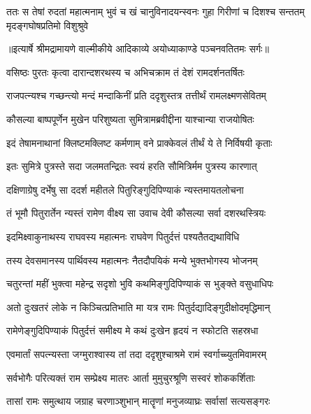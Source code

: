 \fourlineindentedshloka
{ततः स तेषां रुदतां महात्मनाम्}
{भुवं च खं चानुविनादयन्स्वनः}
{गुहा गिरीणां च दिशश्च सन्ततम्}
{मृदङ्गघोषप्रतिमो विशुश्रुवे} %


{॥इत्यार्षे श्रीमद्रामायणे वाल्मीकीये आदिकाव्ये अयोध्याकाण्डे पञ्चनवतितमः सर्गः॥}


\twolineshloka
{वसिष्ठः पुरतः कृत्वा दारान्दशरथस्य च}
{अभिचक्राम तं देशं रामदर्शनतर्षितः} %

\twolineshloka
{राजपत्न्यश्च गच्छन्त्यो मन्दं मन्दाकिनीं प्रति}
{ददृशुस्तत्र तत्तीर्थं रामलक्ष्मणसेवितम्} %

\twolineshloka
{कौसल्या बाष्पपूर्णेन मुखेन परिशुष्यता}
{सुमित्रामब्रवीद्दीना याश्चान्या राजयोषितः} %

\twolineshloka
{इदं तेषामनाथानां क्लिष्टमक्लिष्ट कर्मणाम्}
{वने प्राक्केवलं तीर्थं ये ते निर्विषयी कृताः} %

\twolineshloka
{इतः सुमित्रे पुत्रस्ते सदा जलमतन्द्रितः}
{स्वयं हरति सौमित्रिर्मम पुत्रस्य कारणात्} %

\twolineshloka
{दक्षिणाग्रेषु दर्भेषु सा ददर्श महीतले}
{पितुरिङ्गुदिपिण्याकं न्यस्तमायतलोचना} %

\twolineshloka
{तं भूमौ पितुरार्तेन न्यस्तं रामेण वीक्ष्य सा}
{उवाच देवी कौसल्या सर्वा दशरथस्त्रियः} %

\twolineshloka
{इदमिक्ष्वाकुनाथस्य राघवस्य महात्मनः}
{राघवेण पितुर्दत्तं पश्यतैतद्यथाविधि} %

\twolineshloka
{तस्य देवसमानस्य पार्थिवस्य महात्मनः}
{नैतदौपयिकं मन्ये भुक्तभोगस्य भोजनम्} %

\twolineshloka
{चतुरन्तां महीं भुक्त्वा महेन्द्र सदृशो भुवि}
{कथमिङ्गुदिपिण्याकं स भुङ्क्ते वसुधाधिपः} %

\twolineshloka
{अतो दुःखतरं लोके न किञ्चित्प्रतिभाति मा}
{यत्र रामः पितुर्दद्यादिङ्गुदीक्षोदमृद्धिमान्} %

\twolineshloka
{रामेणेङ्गुदिपिण्याकं पितुर्दत्तं समीक्ष्य मे}
{कथं दुःखेन हृदयं न स्फोटति सहस्रधा} %

\twolineshloka
{एवमार्तां सपत्न्यस्ता जग्मुराश्वास्य तां तदा}
{ददृशुश्चाश्रमे रामं स्वर्गाच्च्युतमिवामरम्} %

\twolineshloka
{सर्वभोगैः परित्यक्तं राम सम्प्रेक्ष्य मातरः}
{आर्ता मुमुचुरश्रूणि सस्वरं शोककर्शिताः} %

\twolineshloka
{तासां रामः समुत्थाय जग्राह चरणाञ्शुभान्}
{मातॄणां मनुजव्याघ्रः सर्वासां सत्यसङ्गरः} %

